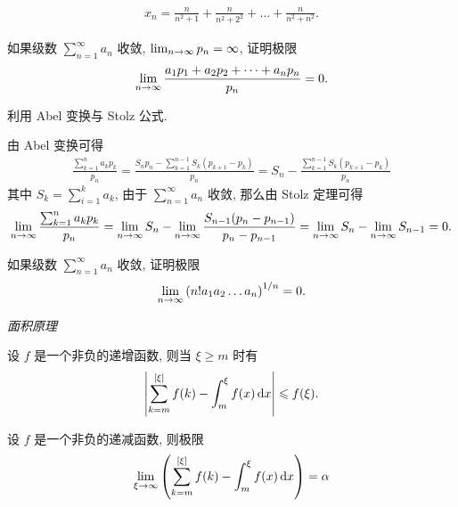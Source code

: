 \begin{exercise}[series=exer]
  \begin{align*}
      x_{n} = \frac{n}{n^{2} + 1} + \frac{n}{n^{2} + 2^{2}} + \dots + \frac{n}{n^{2} + n^{2}}.
  \end{align*}
  \item 如果级数 $ \sum_{n = 1}^{\infty} a_{n} $ 收敛, $ \lim_{n \to \infty} p_{n} = \infty $, 证明极限
  \begin{align*}
      \lim_{n \to \infty}\frac{a_{1} p_{1} + a_{2} p_{2} + \dots + a_{n} p_{n}}{p_{n}} = 0.
  \end{align*}
  \begin{hint}
      利用 Abel 变换与 Stolz 公式.
  \end{hint}
  \begin{answer}
      由 Abel 变换可得
      \begin{align*}
          \frac{\sum_{k = 1}^{n} a_{k}p_{k}}{p_{n}} = \frac{S_{n}p_{n} - \sum_{k = 1}^{n - 1}S_{k}(p_{k + 1} - p_{k})}{p_{n}} = S_{n} - \frac{\sum_{k = 1}^{n - 1}S_{k}(p_{k + 1} - p_{k})}{p_{n}}
      \end{align*}
      其中 $ S_{k} = \sum_{i = 1}^{k}a_{k} $, 由于 $ \sum_{n = 1}^{\infty}a_{n} $ 收敛, 那么由 Stolz 定理可得
      \begin{align*}
          \lim_{n \to \infty}\frac{\sum_{k = 1}^{n} a_{k}p_{k}}{p_{n}} = \lim_{n \to \infty}S_{n} - \lim_{n \to \infty}\frac{S_{n - 1}(p_{n} - p_{n - 1})}{p_{n} - p_{n - 1}} = \lim_{n \to \infty}S_{n} - \lim_{n \to \infty}S_{n - 1} = 0.
      \end{align*}
  \end{answer}
  \item 如果级数 $ \sum_{n = 1}^{\infty} a_{n} $ 收敛, 证明极限
  \begin{align*}
      \lim_{n \to \infty}\qty(n! a_{1} a_{2} \dots a_{n})^{1/n} = 0.
  \end{align*}
  \item \emph{面积原理}
  \begin{exercise}
      \item 设 $ f $ 是一个非负的递增函数, 则当 $ \xi \ge m $ 时有
      \begin{align*}
          \abs{\sum_{k = m}^{[\xi]} f(k) - \int_{m}^{\xi} f(x) \dx*} \le f(\xi).
      \end{align*}
      \item 设 $ f $ 是一个非负的递减函数, 则极限
      \begin{align*}
          \limit{\xi}{\infty} \qty(\sum_{k = m}^{[\xi]} f(k) - \int_{m}^{\xi} f(x) \dx*) = \alpha
      \end{align*}

\end{exercise}
\end{exercise}
